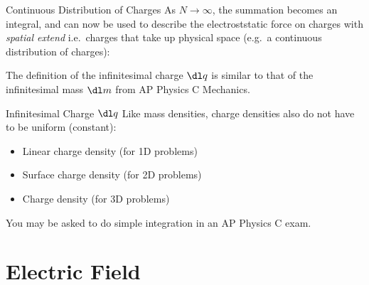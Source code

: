 \documentclass[12pt,aspectratio=169]{beamer}
\begin{document}
\begin{frame}{Continuous Distribution of Charges}
  As $N\rightarrow\infty$, the summation becomes an integral, and can now be
  used to describe the electroststatic force on charges with
  \emph{spatial extend} i.e.\ charges that take up physical space (e.g.\ a
  continuous distribution of charges):


  The definition of the infinitesimal charge $\dl q$ is similar to that of the
  infinitesimal mass $\dl m$ from AP Physics C Mechanics.
\end{frame}



\begin{frame}{Infinitesimal Charge $\dl q$}
  Like mass densities, charge densities also do not have to be uniform
  (constant):
  \begin{itemize}
  \item Linear charge density (for 1D problems)


  \item\vspace{-.05in} Surface charge density (for 2D problems)


  \item\vspace{-.05in} Charge density (for 3D problems)

  \end{itemize}
  You may be asked to do simple integration in an AP Physics C exam.
\end{frame}

    

\section{Electric Field}
\end{document}
